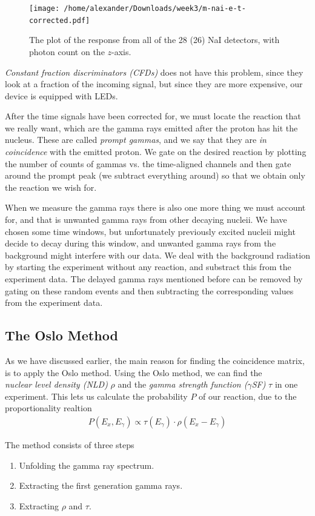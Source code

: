 \documentclass[a4paper,12pt]{article}
\newcommand{\eq}[1]{{\small\begin{align*}#1\end{align*}}}
\begin{document}
\begin{figure}[H]
    \centering
    \texttt{[image: /home/alexander/Downloads/week3/m-nai-e-t-corrected.pdf]}
    \caption{The plot of the response from all of the 28 (26) NaI detectors, with photon count on the $z$-axis.}
    \label{fig:time-uncorrected}
\end{figure}

\textit{Constant fraction discriminators (CFDs)} does not have this
problem, since they look at a fraction of the incoming
signal, but since they are more expensive, our device
is equipped with LEDs.

After the time signals have been corrected for,
we must locate the reaction that we really want,
which are the gamma rays emitted after the proton has
hit the nucleus. These are called \textit{prompt gammas},
and we say that they are \textit{in coincidence} with the
emitted proton.
We gate on the desired reaction by plotting the number of
counts of gammas vs. the time-aligned channels and then
gate around the prompt peak (we subtract everything around)
so that we obtain only the reaction we wish for.

When we measure the gamma rays there is also one more thing we
must account for, and that is unwanted gamma rays from other 
decaying nucleii.
We have chosen some time windows, but unfortunately
previously excited nucleii might decide to decay during
this window, and unwanted gamma rays from the background 
might interfere with our data.
We deal with the background radiation by starting the experiment
without any reaction, and substract this from the experiment data.
The delayed gamma rays mentioned before can be removed by
gating on these random events and then subtracting the
corresponding values from the experiment data.

\subsection{The Oslo Method}
As we have discussed earlier, the main reason for finding the
coincidence matrix, is to apply the Oslo method.
Using the Oslo method, we can find the \\
\textit{nuclear level density (NLD)}
$\rho$ and the \textit{gamma strength function ($\gamma$SF)} 
$\tau$ in one experiment.
This lets us calculate the probability $P$ of our reaction,
due to the proportionality realtion
\eq{P(E_x,E_\gamma)\propto \tau(E_\gamma)\cdot\rho(E_x-E_\gamma)}

The method consists of three steps
\begin{enumerate}
    \item Unfolding the gamma ray spectrum.
    \item Extracting the first generation gamma rays.
    \item Extracting $\rho$ and $\tau$.
\end{enumerate}
\end{document}
